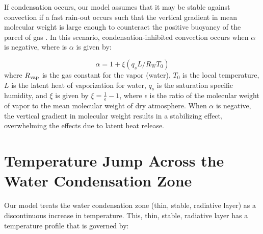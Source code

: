 \documentclass[11pt]{ucscthesisbs}
\begin{document}
If condensation occurs, our model assumes that it may be stable against convection if a fast rain-out occurs such that the vertical gradient in mean molecular weight is large enough to counteract the positive buoyancy of the parcel of gas \citep{leconte_2017} \citep{friedson_2017}. In this scenario, condensation-inhibited convection occurs when $\alpha$ is negative, where is $\alpha$ \citep{friedson_2017} is given by:

\begin{equation}
  \alpha = 1 + \xi (q_{s} L / R_{W} T_{0}) 
  \label{eq:alpha}
\end{equation}
where $R_{\rm vap}$ is the gas constant for the vapor (water), $T_{0}$ is the local temperature, $L$ is the latent heat of vaporization for water, $q_{s}$ is the saturation specific humidity, and $\xi$ is given by $\xi = \frac{1}{\epsilon} - 1$, where $\epsilon$ is the ratio of the molecular weight of vapor to the mean molecular weight of dry atmosphere. When $\alpha$ is negative, the vertical gradient in molecular weight results in a stabilizing effect, overwhelming the effects due to latent heat release.

\section{Temperature Jump Across the Water Condensation Zone}
Our model treats the water condensation zone (thin, stable, radiative layer) as a discontinuous increase in temperature. This, thin, stable, radiative layer has a temperature profile that is governed by:
\end{document}
